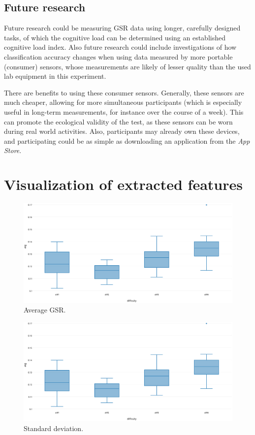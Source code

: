 \documentclass[11pt,leqno,a4paper]{report} %
\begin{document}
\section{Future research}
Future research could be measuring GSR data using longer, carefully designed tasks, of which the cognitive load can be determined using an established cognitive load index.
Also future research could include investigations of how classification accuracy changes when using data measured by more portable (consumer) sensors, whose measurements are likely of lesser quality than the used lab equipment in this experiment. 

There are benefits to using these consumer sensors. Generally, these sensors are much cheaper, allowing for more simultaneous participants (which is especially useful in long-term measurements, for instance over the course of a week). This can promote the ecological validity of the test, as these sensors can be worn during real world activities. Also, participants may already own these devices, and participating could be as simple as downloading an application from the \emph{App Store}.
 

\appendix
\chapter{Visualization of extracted features}


\begin{figure}[H]
  \centering
 	\hspace*{-.3\textwidth}   
 	\includegraphics[width=1.6\textwidth]{avggsr.eps}
  \caption{Average GSR.}
\end{figure}

\begin{figure}[H]
  \centering
 	\hspace*{-.3\textwidth}   
 	\includegraphics[width=1.6\textwidth]{avggsr.eps}
  \caption{Standard deviation.}
\end{figure}
\end{document}
